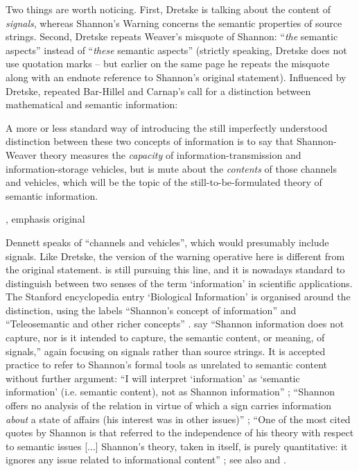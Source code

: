 \documentclass[12pt]{article}
\begin{document}
\noindent Two things are worth noticing.
First, Dretske is talking about the content of \textit{signals}, whereas {\sc Shannon's Warning} concerns the semantic properties of source strings.
Second, Dretske repeats Weaver's misquote of Shannon: ``\textit{the} semantic aspects'' instead of ``\textit{these} semantic aspects'' (strictly speaking, Dretske does not use quotation marks -- but earlier on the same page he repeats the misquote along with an endnote reference to Shannon's original statement).
Influenced by Dretske, \citet{dennett1983intentional} repeated Bar-Hillel and Carnap's call for a distinction between mathematical and semantic information:

\begin{myquote}
A more or less standard way of introducing the still imperfectly understood distinction between these two concepts of information is to say that Shannon-Weaver theory measures the \emph{capacity} of information-transmission and information-storage vehicles, but is mute about the \emph{contents} of those channels and vehicles, which will be the topic of the still-to-be-formulated theory of semantic information.
\par\hspace*{\fill}\citet[344]{dennett1983intentional}, emphasis original
\end{myquote}

\noindent Dennett speaks of ``channels and vehicles'', which would presumably include signals.
Like Dretske, the version of the warning operative here is different from the original statement.
\citet[$\S$6]{dennett2017bacteria} is still pursuing this line, and it is nowadays standard to distinguish between two senses of the term `information' in scientific applications.
The Stanford encyclopedia entry `Biological Information' is organised around the distinction, using the labels ``Shannon's concept of information'' and ``Teleosemantic and other richer concepts'' \citep{godfrey-smith2016biological}.
\citet[21]{piccinini2011information} say ``Shannon information does not capture, nor is it intended to capture, the semantic content, or meaning, of signals,'' again focusing on signals rather than source strings.
It is accepted practice to refer to Shannon's formal tools as unrelated to semantic content without further argument: ``I will interpret ‘information’ as ‘semantic information’ (i.e. semantic content), not as Shannon information'' \citep[p. 12 n. 14]{artiga2020signals}; ``Shannon offers no analysis of the relation in virtue of which a sign carries information \textit{about} a state of affairs (his interest was in other issues)''  \citep[p. 7, emphasis original]{neander2017mark}; ``One of the most cited quotes by Shannon is that referred to the independence of his theory with respect to semantic issues [...] Shannon’s theory, taken in itself, is purely quantitative: it ignores any issue related to informational content'' \citep[1988-9]{lombardi2015shannon}; see also \citet[6]{cao2020new} and \citet[1]{kolchinsky2018semantic}.
\end{document}
